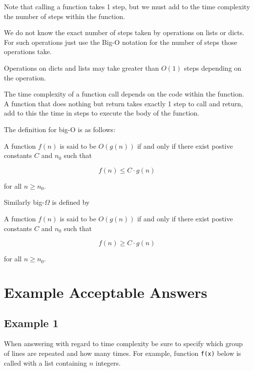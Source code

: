 \documentclass{article}
\begin{document}
Note that calling a function takes 1 step, but we must add
to the time complexity the number of steps within the function.

We do not know the exact number of steps taken by operations
on lists or dicts.  For such operations just use the Big-O
notation for the number of steps those operations take.

Operations on dicts and lists may take greater than $O(1)$ steps
depending on the operation.

The time complexity of a function call depends on the code within the
function.  A function that does nothing but return takes exactly 1
step to call and return, add to this the time in steps to execute the
body of the function.

The definition for big-O is as follows:

\begin{center}
\begin{minipage}{3in}
A function $f(n)$ is said to be $O(g(n))$ if 
and only if there exist postive constants $C$ and $n_0$ such that

\[
  f(n) \leq C \cdot g(n)
\]

for all $n \geq n_0$.
\end{minipage}
\end{center}

Similarly big-$\Omega$ is defined by

\begin{center}
\begin{minipage}{3in}
A function $f(n)$ is said to be $O(g(n))$ if 
and only if there exist postive constants $C$ and $n_0$ such that

\[
  f(n) \geq C \cdot g(n)
\]

for all $n \geq n_0$.
\end{minipage}
\end{center}


\newpage

\section{Example Acceptable Answers}

\subsection{Example 1}

When answering with regard to time complexity be sure to specify
which group of lines are repeated and how many times.  For example,
function \verb|f(x)| below is called with a list containing $n$ integers.
\end{document}
